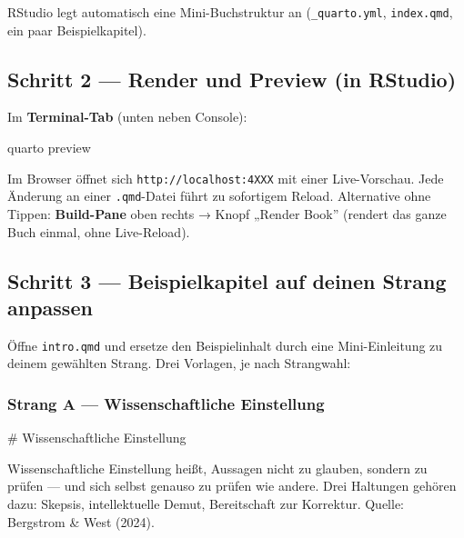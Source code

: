 \documentclass[
  ngerman,
  a4paper,
  DIV=11]{scrreprt}
\newenvironment{Shaded}{\begin{snugshade}}{\end{snugshade}}
\newcommand{\ExtensionTok}[1]{\textcolor[rgb]{0.00,0.23,0.31}{#1}}
\newcommand{\FunctionTok}[1]{\textcolor[rgb]{0.28,0.35,0.67}{#1}}
\newcommand{\NormalTok}[1]{\textcolor[rgb]{0.00,0.23,0.31}{#1}}
\begin{document}
RStudio legt automatisch eine Mini-Buchstruktur an
(\texttt{\_quarto.yml}, \texttt{index.qmd}, ein paar Beispielkapitel).

\subsection{Schritt 2 --- Render und Preview (in
RStudio)}\label{schritt-2-render-und-preview-in-rstudio}

Im \textbf{Terminal-Tab} (unten neben Console):

\begin{Shaded}
\begin{Highlighting}[]
\ExtensionTok{quarto}\NormalTok{ preview}
\end{Highlighting}
\end{Shaded}

Im Browser öffnet sich \texttt{http://localhost:4XXX} mit einer
Live-Vorschau. Jede Änderung an einer \texttt{.qmd}-Datei führt zu
sofortigem Reload. Alternative ohne Tippen: \textbf{Build-Pane} oben
rechts → Knopf „Render Book'' (rendert das ganze Buch einmal, ohne
Live-Reload).

\subsection{Schritt 3 --- Beispielkapitel auf deinen Strang
anpassen}\label{schritt-3-beispielkapitel-auf-deinen-strang-anpassen}

Öffne \texttt{intro.qmd} und ersetze den Beispielinhalt durch eine
Mini-Einleitung zu deinem gewählten Strang. Drei Vorlagen, je nach
Strangwahl:

\subsubsection{Strang A --- Wissenschaftliche Einstellung}

\begin{Shaded}
\begin{Highlighting}[]
\FunctionTok{\# Wissenschaftliche Einstellung}

\NormalTok{Wissenschaftliche Einstellung heißt, Aussagen nicht zu glauben, sondern}
\NormalTok{zu prüfen — und sich selbst genauso zu prüfen wie andere. Drei Haltungen}
\NormalTok{gehören dazu: Skepsis, intellektuelle Demut, Bereitschaft zur Korrektur.}
\NormalTok{Quelle: Bergstrom \& West (2024).}
\end{Highlighting}
\end{Shaded}
\end{document}
